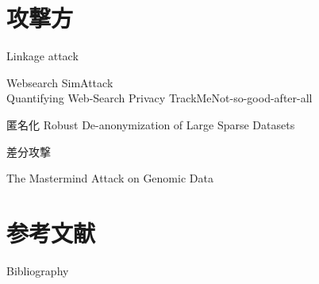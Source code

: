 \documentclass[14pt,xcolor=dvipsnames,table,dvipdfmx]{beamer}
\begin{document}
\section{攻撃方}
\begin{frame}{Linkage attack}
	\begin{exampleblock}{Websearch}
		SimAttack \cite{petit_simattack:_2016} \\
		Quantifying Web-Search Privacy \cite{gervais_quantifying_2014}
		TrackMeNot-so-good-after-all \cite{al-rfou_trackmenot-so-good-after-all_2012}
	\end{exampleblock}
	\begin{exampleblock}{匿名化}
		Robust De-anonymization of Large Sparse Datasets \cite{narayanan_robust_2008}
	\end{exampleblock}
\end{frame}
\begin{frame}{差分攻撃}
	\begin{exampleblock}{}
		The Mastermind Attack on Genomic Data \cite{mastermind}
	\end{exampleblock}
\end{frame}

\section{参考文献}
\begin{frame}[t,allowframebreaks]{Bibliography}
\fontsize{8pt}{7.2}\selectfont


\end{frame}
\end{document}
